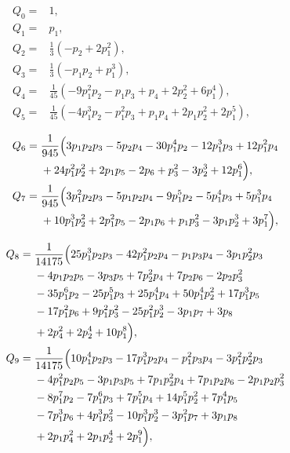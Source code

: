 \documentclass[9pt,twocolumn,twoside]{gsajnl}
\begin{document}
\begin{align}
Q_0={}&1, \label{eq:Q0-p} \\ \nonumber
Q_1={}&p_1, \\ \nonumber
Q_2={}&\frac13\left(-p_2+2p_1^2\right), \\ \nonumber
Q_3={}&\frac13\left(-p_1p_2+p_1^3\right), \\ \nonumber
Q_4={}&\frac1{45}\left(-9p_1^2p_2-p_1p_3+p_4+2p_2^2+6p_1^4\right), \\ \nonumber
Q_5={}&\frac1{45}\left(-4p_1^3p_2-p_1^2p_3+p_1p_4+2p_1p_2^2+2p_1^5\right),
\end{align}

\vspace*{-0.5cm}
\begin{equation*}
\hspace*{0.88cm}
\begin{aligned}
Q_6={}&\frac1{945}\Bigl(
3p_1p_2p_3-5p_2p_4-30p_1^4p_2-12p_1^3p_3+12p_1^2p_4
\notag\\
&+24p_1^2p_2^2+2p_1p_5-2p_6+p_3^2-3p_2^3+12p_1^6
\Bigr), \\
Q_7={}&\frac1{945}\Bigl(
3p_1^2p_2p_3-5p_1p_2p_4-9p_1^5p_2-5p_1^4p_3+5p_1^3p_4
\notag\\
&+10p_1^3p_2^2+2p_1^2p_5-2p_1p_6+p_1p_3^2-3p_1p_2^3+3p_1^7
\Bigr),
\end{aligned}
\end{equation*}

\vspace*{-0.5cm}
\begin{equation*}
\hspace*{0.88cm}
\begin{aligned}
Q_8={}&\frac1{14175}\Bigl(
25p_1^3p_2p_3-42p_1^2p_2p_4-p_1p_3p_4-3p_1p_2^2p_3
\notag\\
&-4p_1p_2p_5-3p_3p_5+7p_2^2p_4+7p_2p_6-2p_2p_3^2
\notag\\
&-35p_1^6p_2-25p_1^5p_3+25p_1^4p_4+50p_1^4p_2^2+17p_1^3p_5
\notag\\
&-17p_1^2p_6+9p_1^2p_3^2-25p_1^2p_2^3-3p_1p_7+3p_8
\notag\\
&+2p_4^2+2p_2^4+10p_1^8
\Bigr), \\
Q_9={}&\frac1{14175}\Bigl(
10p_1^4p_2p_3-17p_1^3p_2p_4-p_1^2p_3p_4-3p_1^2p_2^2p_3
\notag\\
&-4p_1^2p_2p_5-3p_1p_3p_5+7p_1p_2^2p_4+7p_1p_2p_6-2p_1p_2p_3^2
\notag\\
&-8p_1^7p_2-7p_1^6p_3+7p_1^5p_4+14p_1^5p_2^2+7p_1^4p_5
\notag\\
&-7p_1^3p_6+4p_1^3p_3^2-10p_1^3p_2^3-3p_1^2p_7+3p_1p_8
\notag\\
&+2p_1p_4^2+2p_1p_2^4+2p_1^9
\Bigr),
\end{aligned}
\end{equation*}
\end{document}
